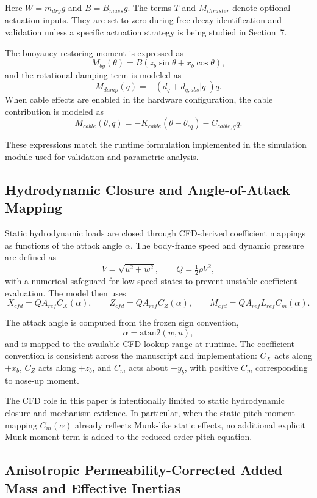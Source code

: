 Here $W=m_{dry}g$ and $B=B_{mass}g$. The terms $T$ and $M_{thruster}$ denote optional actuation inputs. They are set to zero during free-decay identification and validation unless a specific actuation strategy is being studied in Section~7.

The buoyancy restoring moment is expressed as
\[
M_{bg}(\theta)=B\left(z_b\sin\theta + x_b\cos\theta\right),
\]
and the rotational damping term is modeled as
\[
M_{damp}(q)=-(d_q+d_{q,abs}|q|)q.
\]
When cable effects are enabled in the hardware configuration, the cable contribution is modeled as
\[
M_{cable}(\theta,q)=-K_{cable}(\theta-\theta_{eq})-C_{cable,q}q.
\]

These expressions match the runtime formulation implemented in the simulation module used for validation and parametric analysis.

\subsection{Hydrodynamic Closure and Angle-of-Attack Mapping}

Static hydrodynamic loads are closed through CFD-derived coefficient mappings as functions of the attack angle $\alpha$. The body-frame speed and dynamic pressure are defined as
\[
V=\sqrt{u^2+w^2}, \qquad Q=\tfrac{1}{2}\rho V^2,
\]
with a numerical safeguard for low-speed states to prevent unstable coefficient evaluation. The model then uses
\[
X_{cfd}=QA_{ref}C_X(\alpha), \qquad
Z_{cfd}=QA_{ref}C_Z(\alpha), \qquad
M_{cfd}=QA_{ref}L_{ref}C_m(\alpha).
\]

The attack angle is computed from the frozen sign convention,
\[
\alpha=\mathrm{atan2}(w,u),
\]
and is mapped to the available CFD lookup range at runtime. The coefficient convention is consistent across the manuscript and implementation: $C_X$ acts along $+x_b$, $C_Z$ acts along $+z_b$, and $C_m$ acts about $+y_b$, with positive $C_m$ corresponding to nose-up moment.

The CFD role in this paper is intentionally limited to static hydrodynamic closure and mechanism evidence. In particular, when the static pitch-moment mapping $C_m(\alpha)$ already reflects Munk-like static effects, no additional explicit Munk-moment term is added to the reduced-order pitch equation.

\subsection{Anisotropic Permeability-Corrected Added Mass and Effective Inertias}

